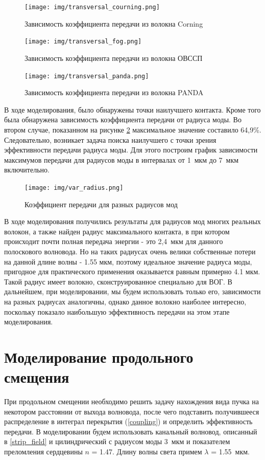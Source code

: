 \begin{figure}[h!]
		\texttt{[image: img/transversal\_courning.png]}
		\caption{Зависимость коэффициента передачи из волокна Corning}
\end{figure}
\begin{figure}[h!]
		\texttt{[image: img/transversal\_fog.png]}
		\caption{Зависимость коэффициента передачи из волокна ОВССП}
		\label{transversal_fog}
\end{figure}
\begin{figure}[h!]
		\texttt{[image: img/transversal\_panda.png]}
		\caption{Зависимость коэффициента передачи из волокна PANDA}
		\label{transversal_fog}
\end{figure}

В ходе моделирования, было обнаружены точки наилучшего контакта. Кроме того была обнаружена зависимость коэффициента передачи от радиуса моды. Во втором случае, показанном на рисунке \ref{transversal_fog} максимальное значение составило 64,9\%. Следовательно, возникает задача поиска наилучшего с точки зрения эффективности передачи радиуса моды. Для этого построим график зависимости максимумов передачи для радиусов моды в интервалах от 1~мкм до 7~мкм включительно.
\begin{figure}[h!]
		\texttt{[image: img/var\_radius.png]}
		\caption{Коэффициент передачи для разных радиусов мод}
\end{figure}

В ходе моделирования получились результаты для радиусов мод многих реальных волокон, а также найден радиус максимального контакта, в при котором происходит почти полная передача энергии - это 2,4~мкм для данного полоскового волновода. Но на таких радиусах очень велики собственные потери на данной длине волны - 1.55 мкм, поэтому идеальное значение радиуса моды, пригодное для практического применения оказывается равным примерно 4.1 мкм. Такой радиус имеет волокно, сконструированное специально для ВОГ. В дальнейшем, при моделировании, мы будем использовать только его, зависимости на разных радиусах аналогичны, однако данное волокно наиболее интересно, поскольку показало наибольшую эффективность передачи на этом этапе моделирования.

\section{Моделирование продольного смещения}

При продольном смещении необходимо решить задачу нахождения вида пучка на некотором расстоянии от выхода волновода, после чего подставить получившееся распределение в интеграл перекрытия (\ref{coupling}) и определить эффективность передачи.
В моделировании будем использовать канальный волновод, описанный в \ref{strip_field} и цилиндрический с радиусом моды 3~мкм и показателем преломления сердцевины $n$ = 1.47. Длину волны света примем $\lambda$ = 1.55~мкм.

